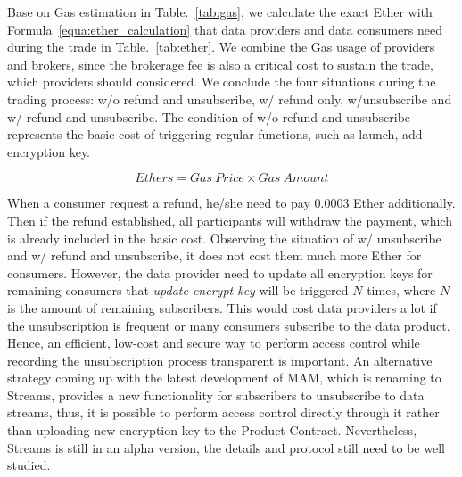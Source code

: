 \documentclass[conference]{IEEEtran}
\begin{document}
Base on Gas estimation in Table.~\ref{tab:gas}, we calculate the exact Ether with Formula~\ref{equa:ether_calculation} that data providers and data consumers need during the trade in Table.~\ref{tab:ether}. We combine the Gas usage of providers and brokers, since the brokerage fee is also a critical cost to sustain the trade, which providers should considered. We conclude the four situations during the trading process: w/o refund and unsubscribe, w/ refund only, w/unsubscribe and w/ refund and unsubscribe. The condition of w/o refund and unsubscribe represents the basic cost of  triggering regular functions, such as launch, add encryption key. 

\begin{equation}
\label{equa:ether_calculation}
Ethers = Gas \ Price \times Gas \ Amount
\end{equation}

When a consumer request a refund, he/she need to pay 0.0003 Ether additionally. Then if the refund established, all participants will withdraw the payment, which is already included in the basic cost. Observing the situation of w/ unsubscribe and w/ refund and unsubscribe, it does not cost them much more Ether for consumers. However, the data provider need to update all encryption keys for remaining consumers that \textit{update encrypt key} will be triggered $N$ times, where $N$ is the amount of remaining subscribers. This would cost data providers a lot if the unsubscription is frequent or many consumers subscribe to the data product. Hence, an efficient, low-cost and secure way to perform access control while recording the unsubscription process transparent is important. An alternative strategy coming up with the latest development of MAM, which is renaming to Streams\cite{stream}, provides a new functionality for subscribers to unsubscribe to data streams, thus, it is possible to perform access control directly through it rather than uploading new encryption key to the Product Contract. Nevertheless, Streams is still in an alpha version, the details and protocol still need to be well studied.
\end{document}
